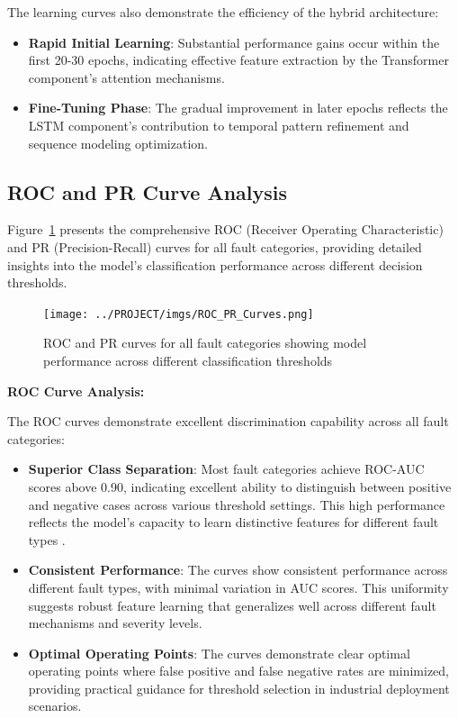 The learning curves also demonstrate the efficiency of the hybrid architecture:

\begin{itemize}
    \item \textbf{Rapid Initial Learning}: Substantial performance gains occur within the first 20-30 epochs, indicating effective feature extraction by the Transformer component's attention mechanisms.
    
    \item \textbf{Fine-Tuning Phase}: The gradual improvement in later epochs reflects the LSTM component's contribution to temporal pattern refinement and sequence modeling optimization.
\end{itemize}

\subsection{ROC and PR Curve Analysis}
\label{subsec:roc_pr_analysis}

Figure~\ref{fig:roc_pr_curves} presents the comprehensive ROC (Receiver Operating Characteristic) and PR (Precision-Recall) curves for all fault categories, providing detailed insights into the model's classification performance across different decision thresholds.

\begin{figure}[ht]
\centering
\texttt{[image: ../PROJECT/imgs/ROC\_PR\_Curves.png]}
\caption{ROC and PR curves for all fault categories showing model performance across different classification thresholds}
\label{fig:roc_pr_curves}
\end{figure}

\textbf{ROC Curve Analysis:}

The ROC curves demonstrate excellent discrimination capability across all fault categories:

\begin{itemize}
    \item \textbf{Superior Class Separation}: Most fault categories achieve ROC-AUC scores above 0.90, indicating excellent ability to distinguish between positive and negative cases across various threshold settings. This high performance reflects the model's capacity to learn distinctive features for different fault types \citep{hastie2009elements}.
    
    \item \textbf{Consistent Performance}: The curves show consistent performance across different fault types, with minimal variation in AUC scores. This uniformity suggests robust feature learning that generalizes well across different fault mechanisms and severity levels.
    
    \item \textbf{Optimal Operating Points}: The curves demonstrate clear optimal operating points where false positive and false negative rates are minimized, providing practical guidance for threshold selection in industrial deployment scenarios.
\end{itemize}

